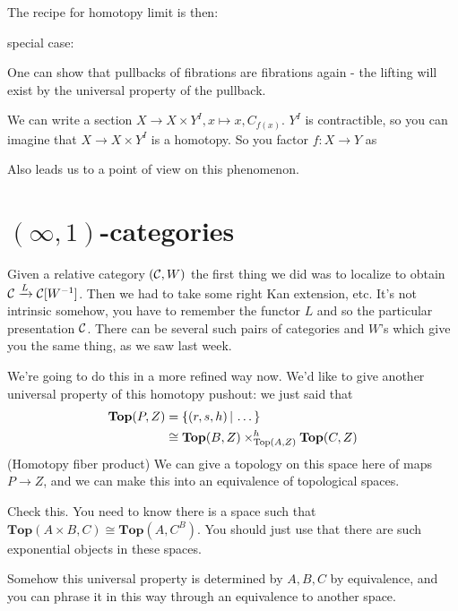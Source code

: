 \documentclass[../MH_Total.tex]{subfiles}
\begin{document}
The recipe for homotopy limit is then:

special case:
\begin{center}
\end{center}
One can show that pullbacks of fibrations are fibrations again - the lifting will exist by the universal property of the pullback. 

We can write a section $X \to X \times Y^I, x \mapsto x,C_{f(x)}$. $Y^I$ is contractible, so you can imagine that $X \to X \times Y^I$ is a homotopy. So you factor $f: X \to Y$ as
\begin{center}
\end{center}
Also leads us to a point of view on this phenomenon.

\section{$(\infty, 1)$-categories}
Given a relative category $(\mathcal{C},W)$ the first thing we did was to localize to obtain $\mathcal{C} \xrightarrow{L} \mathcal{C}[W^{-1}]$. Then we had to take some right Kan extension, etc. It's not intrinsic somehow, you have to remember the functor $L$ and so the particular presentation $\mathcal{C}$. There can be several such pairs of categories and $W$'s which give you the same thing, as we saw last week. 

We're going to do this in a more refined way now. We'd like to give another universal property of this homotopy pushout: we just said that 
\begin{align*}
\mathbf{Top}(P,Z) &= \{(r,s,h)\,|\,\dots\}\\
&\cong \mathbf{Top}(B,Z) \times^h_{\operatorname{Top}(A,Z)} \mathbf{Top}(C,Z)
\end{align*}
(Homotopy fiber product) We can give a topology on this space here of maps $P \to Z$, and we can make this into an equivalence of topological spaces.

\begin{exercise}
 	Check this. You need to know there is a space such that $\mathbf{Top}(A \times B,C) \cong \mathbf{Top}(A,C^B)$. You should just use that there are such exponential objects in these spaces.
 \end{exercise} 
Somehow this universal property is determined by $A,B,C$ by equivalence, and you can phrase it in this way through an equivalence to another space. 
\end{document}

